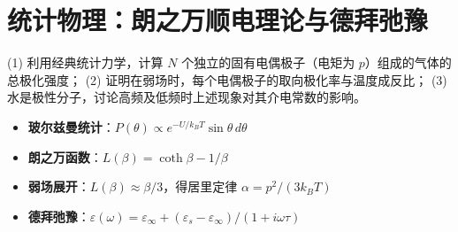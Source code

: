 \section{统计物理：朗之万顺电理论与德拜弛豫}
\label{sec:langevin-polarization}

\begin{modelbox}[题目：固有电偶极子气体的极化与水的介电响应]
(1) 利用经典统计力学，计算 $N$ 个独立的固有电偶极子（电矩为 $p$）组成的气体的总极化强度；
(2) 证明在弱场时，每个电偶极子的取向极化率与温度成反比；
(3) 水是极性分子，讨论高频及低频时上述现象对其介电常数的影响。
\end{modelbox}

\begin{tipbox}[考点快速分析]
\begin{itemize}
    \item \textbf{玻尔兹曼统计}：$P(\theta)\propto e^{-U/k_BT}\sin\theta\,d\theta$
    \item \textbf{朗之万函数}：$L(\beta)=\coth\beta-1/\beta$
    \item \textbf{弱场展开}：$L(\beta)\approx\beta/3$，得居里定律 $\alpha=p^2/(3k_BT)$
    \item \textbf{德拜弛豫}：$\varepsilon(\omega)=\varepsilon_\infty+(\varepsilon_s-\varepsilon_\infty)/(1+i\omega\tau)$
\end{itemize}
\end{tipbox}

